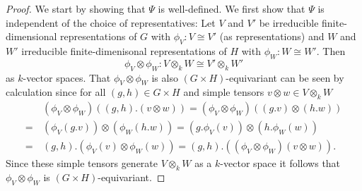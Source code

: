 \begin{proof}
  We start by showing that $\Psi$ is well-defined. We first show that $\Psi$ is independent of the choice of representatives: Let $V$ and $V'$ be irreducible finite-dimensional representations of $G$ with $\phi_V \colon V \cong V'$ (as representations) and $W$ and $W'$ irreducible finite-dimenisonal representations of $H$ with $\phi_W \colon W \cong W'$. Then
  \[
    \phi_V \otimes \phi_W \colon V \otimes_k W \cong V' \otimes_k W'
  \]
  as $k$-vector spaces. That $\phi_V \otimes \phi_W$ is also $(G \times H)$-equivariant can be seen by calculation since for all $(g,h) \in G \times H$ and simple tensors $v \otimes w \in V \otimes_k W$
  \begin{align*}
      &\, (\phi_V \otimes \phi_W)((g,h).(v \otimes w))
    =    (\phi_V \otimes \phi_W)((g.v) \otimes (h.w)) \\
    =&\, (\phi_V(g.v)) \otimes (\phi_W(h.w))
    =    (g.\phi_V(v)) \otimes (h.\phi_W(w)) \\
    =&\, (g,h).(\phi_V(v) \otimes \phi_W(w))
    =    (g,h).((\phi_V \otimes \phi_W)(v \otimes w)).
  \end{align*}
  Since these simple tensors generate $V \otimes_k W$ as a $k$-vector space it follows that $\phi_V \otimes \phi_W$ is $(G \times H)$-equivariant.
  

\end{proof}
